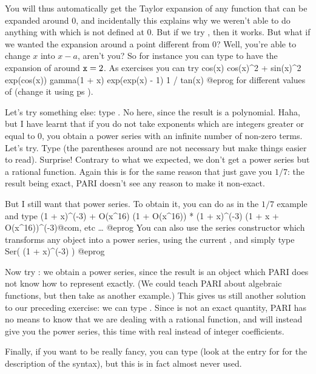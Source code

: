 You will thus automatically get the Taylor expansion of any function that can
be expanded around $0$, and incidentally this explains why we weren't
able to do anything with  which is not defined at 0. But if we
try , then it works. But what if we wanted the expansion
around a point different from 0? Well, you're able to change $x$ into
$x-a$, aren't you? So for instance you can type  to
have the expansion of  around ${\tt x}=2$. As exercises you can
try
\bprog
cos(x)           cos(x)^2 + sin(x)^2           exp(cos(x))
gamma(1 + x)     exp(exp(x) - 1)               1 / tan(x)
@eprog
\noindent for different values of  (change it using \b{ps}
).

Let's try something else: type . No  here, since
the result is a polynomial.  Haha, but I have learnt that if you do not take
exponents which are integers greater or equal to 0, you obtain a power series
with an infinite number of non-zero terms. Let's try.  Type
 (the parentheses around  are not necessary but
make things easier to read). Surprise! Contrary to what we expected, we don't
get a power series but a rational function. Again this is for the same reason
that  just gave you $1/7$: the result being exact, PARI doesn't see
any reason to make it non-exact.

But I still want that power series. To obtain it, you can do as in the $1/7$
example and type
\bprog
(1 + x)^(-3) + O(x^16)
(1 + O(x^16)) * (1 + x)^(-3)
(1 + x + O(x^16))^(-3)@com, etc \dots
@eprog
You can also use the series constructor which transforms any object into a
power series, using the current , and simply type
\bprog
Ser( (1 + x)^(-3) )
@eprog

Now try : we obtain a power series, since the
result is an object which PARI does not know how to represent exactly. (We
could teach PARI about algebraic functions, but then take 
as another example.) This gives us still another solution to our preceding
exercise: we can type . Since  is not an exact
quantity, PARI has no means to know that we are dealing with a rational
function, and will instead give you the power series, this time with real
instead of integer coefficients.

Finally, if you want to be really fancy, you can type
 (look at the entry for  for the
description of the syntax), but this is in fact almost never used.
\smallskip

